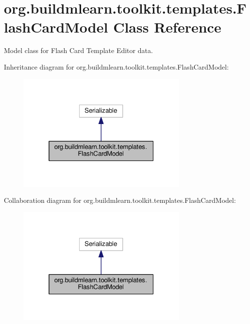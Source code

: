 \hypertarget{classorg_1_1buildmlearn_1_1toolkit_1_1templates_1_1FlashCardModel}{}\section{org.\+buildmlearn.\+toolkit.\+templates.\+Flash\+Card\+Model Class Reference}
\label{classorg_1_1buildmlearn_1_1toolkit_1_1templates_1_1FlashCardModel}


Model class for Flash Card Template Editor data.  




Inheritance diagram for org.\+buildmlearn.\+toolkit.\+templates.\+Flash\+Card\+Model\+:
\nopagebreak
\begin{figure}[H]
\begin{center}
\leavevmode
\includegraphics[width=241pt]{classorg_1_1buildmlearn_1_1toolkit_1_1templates_1_1FlashCardModel__inherit__graph}
\end{center}
\end{figure}


Collaboration diagram for org.\+buildmlearn.\+toolkit.\+templates.\+Flash\+Card\+Model\+:
\nopagebreak
\begin{figure}[H]
\begin{center}
\leavevmode
\includegraphics[width=241pt]{classorg_1_1buildmlearn_1_1toolkit_1_1templates_1_1FlashCardModel__coll__graph}
\end{center}
\end{figure}
